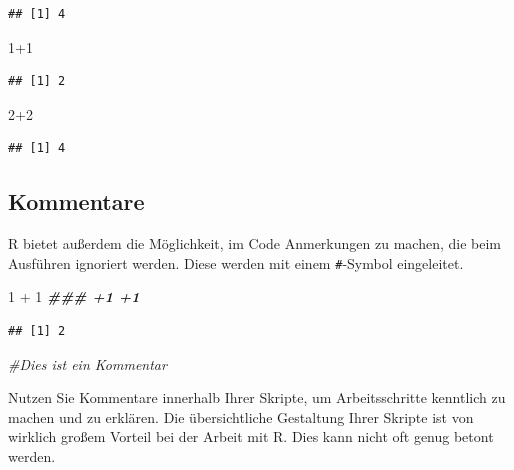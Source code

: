 \documentclass[
]{book}
\newenvironment{Shaded}{\begin{snugshade}}{\end{snugshade}}
\newcommand{\CommentTok}[1]{\textcolor[rgb]{0.56,0.35,0.01}{\textit{#1}}}
\newcommand{\DecValTok}[1]{\textcolor[rgb]{0.00,0.00,0.81}{#1}}
\newcommand{\DocumentationTok}[1]{\textcolor[rgb]{0.56,0.35,0.01}{\textbf{\textit{#1}}}}
\newcommand{\SpecialCharTok}[1]{\textcolor[rgb]{0.00,0.00,0.00}{#1}}
\begin{document}
\begin{verbatim}
## [1] 4
\end{verbatim}

\begin{Shaded}
\begin{Highlighting}[]
\DecValTok{1}\SpecialCharTok{+}\DecValTok{1}
\end{Highlighting}
\end{Shaded}

\begin{verbatim}
## [1] 2
\end{verbatim}

\begin{Shaded}
\begin{Highlighting}[]
\DecValTok{2}\SpecialCharTok{+}\DecValTok{2}
\end{Highlighting}
\end{Shaded}

\begin{verbatim}
## [1] 4
\end{verbatim}

\hypertarget{kommentare}{%
\subsection*{Kommentare}\label{kommentare}}

R bietet außerdem die Möglichkeit, im Code Anmerkungen zu machen, die beim Ausführen ignoriert werden. Diese werden mit einem \texttt{\#}-Symbol eingeleitet.

\begin{Shaded}
\begin{Highlighting}[]
\DecValTok{1} \SpecialCharTok{+} \DecValTok{1} \DocumentationTok{\#\#\# +1 +1}
\end{Highlighting}
\end{Shaded}

\begin{verbatim}
## [1] 2
\end{verbatim}

\begin{Shaded}
\begin{Highlighting}[]
\CommentTok{\#Dies ist ein Kommentar}
\end{Highlighting}
\end{Shaded}

Nutzen Sie Kommentare innerhalb Ihrer Skripte, um Arbeitsschritte kenntlich zu machen und zu erklären. Die übersichtliche Gestaltung Ihrer Skripte ist von wirklich großem Vorteil bei der Arbeit mit R. Dies kann nicht oft genug betont werden.
\end{document}

